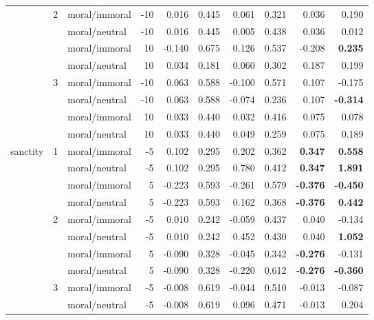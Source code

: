 \documentclass[runninghheads]{llncs}
\begin{document}
\begin{table}[!ht]
\begin{tabular}{|l|l|l|r|r|r|r|r|r|r|}
          \cline{2-10}
         & \multirow{4}{*}{2} & moral/immoral & -10 & 0.016 & 0.445 & 0.061 & 0.321 & 0.036 & 0.190 \\ 
         &  & moral/neutral & -10 & 0.016 & 0.445 & 0.005 & 0.438 & 0.036 & 0.012 \\ 
         &  & moral/immoral & 10 & -0.140 & 0.675 & 0.126 & 0.537 & -0.208 & \textbf{0.235} \\ 
         &  & moral/neutral & 10 & 0.034 & 0.181 & 0.060 & 0.302 & 0.187 & 0.199 \\ 
          \cline{2-10}
         & \multirow{4}{*}{3} & moral/immoral & -10 & 0.063 & 0.588 & -0.100 & 0.571 & 0.107 & -0.175 \\ 
         &  & moral/neutral & -10 & 0.063 & 0.588 & -0.074 & 0.236 & 0.107 & \textbf{-0.314} \\
         &  & moral/immoral & 10 & 0.033 & 0.440 & 0.032 & 0.416 & 0.075 & 0.078 \\ 
         &  & moral/neutral & 10 & 0.033 & 0.440 & 0.049 & 0.259 & 0.075 & 0.189 \\ 
        \hline\hline
        \multirow{12}{*}{sanctity} & \multirow{4}{*}{1} & moral/immoral & -5 & 0.102 & 0.295 & 0.202 & 0.362 & \textbf{0.347} & \textbf{0.558} \\ 
         &  & moral/neutral & -5 & 0.102 & 0.295 & 0.780 & 0.412 & \textbf{0.347} & \textbf{1.891} \\ 
         &  & moral/immoral & 5 & -0.223 & 0.593 & -0.261 & 0.579 & \textbf{-0.376} & \textbf{-0.450} \\ 
         &  & moral/neutral & 5 & -0.223 & 0.593 & 0.162 & 0.368 & \textbf{-0.376} & \textbf{0.442} \\ 
          \cline{2-10}
         & \multirow{4}{*}{2} & moral/immoral & -5 & 0.010 & 0.242 & -0.059 & 0.437 & 0.040 & -0.134 \\ 
         &  & moral/neutral & -5 & 0.010 & 0.242 & 0.452 & 0.430 & 0.040 & \textbf{1.052} \\ 
         &  & moral/immoral & 5 & -0.090 & 0.328 & -0.045 & 0.342 & \textbf{-0.276} & -0.131 \\ 
         &  & moral/neutral & 5 & -0.090 & 0.328 & -0.220 & 0.612 & -\textbf{0.276} & \textbf{-0.360} \\ 
         \cline{2-10}       
         & \multirow{4}{*}{3} & moral/immoral & -5 & -0.008 & 0.619 & -0.044 & 0.510 & -0.013 & -0.087 \\ 
         &  & moral/neutral & -5 & -0.008 & 0.619 & 0.096 & 0.471 & -0.013 & 0.204 \\ 

\end{tabular}
\end{table}
\end{document}
